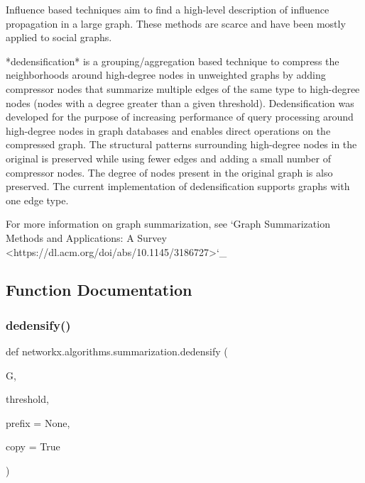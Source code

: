 \begin{DoxyVerb}
Influence based techniques aim to find a high-level description of influence
propagation in a large graph.  These methods are scarce and have been mostly
applied to social graphs.

*dedensification* is a grouping/aggregation based technique to compress the
neighborhoods around high-degree nodes in unweighted graphs by adding
compressor nodes that summarize multiple edges of the same type to
high-degree nodes (nodes with a degree greater than a given threshold).
Dedensification was developed for the purpose of increasing performance of
query processing around high-degree nodes in graph databases and enables direct
operations on the compressed graph.  The structural patterns surrounding
high-degree nodes in the original is preserved while using fewer edges and
adding a small number of compressor nodes.  The degree of nodes present in the
original graph is also preserved. The current implementation of dedensification
supports graphs with one edge type.

For more information on graph summarization, see `Graph Summarization Methods
and Applications: A Survey <https://dl.acm.org/doi/abs/10.1145/3186727>`_
\end{DoxyVerb}
 

\subsection{Function Documentation}
\mbox{\label{namespacenetworkx_1_1algorithms_1_1summarization_a76e504c9155b6b0e797ed530ff73d0a7}} 
\subsubsection{\texorpdfstring{dedensify()}{dedensify()}}
{\footnotesize\ttfamily def networkx.\+algorithms.\+summarization.\+dedensify (\begin{DoxyParamCaption}\item[{}]{G,  }\item[{}]{threshold,  }\item[{}]{prefix = {\ttfamily None},  }\item[{}]{copy = {\ttfamily True} }\end{DoxyParamCaption})}

